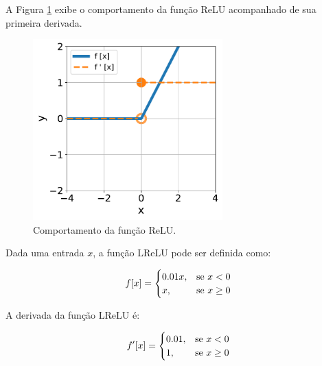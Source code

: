 A Figura \ref{fig:ann_relu_function} exibe o comportamento da função ReLU \citep{nair2010rectified} acompanhado de sua primeira derivada.

\begin{figure}[H]
    \centering
    \includegraphics[width=0.65\textwidth]{figs/ann_relu_function.pdf}

    \caption{Comportamento da função ReLU.}
    \label{fig:ann_relu_function}
\end{figure}


\linebreak
\newpage


\begin{definition}
    Dada uma entrada $x$, a função LReLU pode ser definida como:

    \begin{equation}
        f[x] = 
        \begin{cases}
            0.01 x, & \text{se $x < 0$}\\
            x, & \text{se $x \geq 0$}
        \end{cases}
        \vspace{0.2cm}
        \label{eq:ann_lrelu_function}
    \end{equation}

    A derivada da função LReLU é:

    \begin{equation}
        f'[x] = 
        \begin{cases}
            0.01, & \text{se $x < 0$}\\
            1, & \text{se $x \geq 0$}
        \end{cases}
        \vspace{0.2cm}
        \label{eq:ann_lrelu_function_dy}
    \end{equation}

\end{definition}

